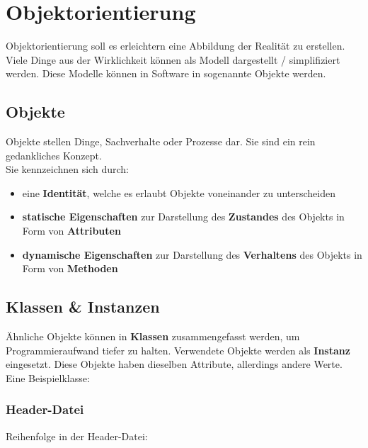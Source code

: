 \section{Objektorientierung}

Objektorientierung soll es erleichtern eine Abbildung der Realität zu erstellen. 
Viele Dinge aus der Wirklichkeit können als Modell dargestellt / simplifiziert werden. 
Diese Modelle können in Software in sogenannte Objekte  werden.

\subsection{Objekte}

Objekte stellen Dinge, Sachverhalte oder Prozesse dar. Sie sind ein rein gedankliches Konzept.\\
Sie kennzeichnen sich durch:

\begin{itemize}[itemsep=1pt, parsep=0pt]
    \item eine \textbf{Identität}, welche es erlaubt Objekte voneinander zu unterscheiden
    \item \textbf{statische Eigenschaften} zur Darstellung des \textbf{Zustandes} des Objekts in Form von \textbf{Attributen}
    \item \textbf{dynamische Eigenschaften} zur Darstellung des \textbf{Verhaltens} des Objekts in Form von \textbf{Methoden}
\end{itemize}


\subsection{Klassen \& Instanzen}

Ähnliche Objekte können in \textbf{Klassen} zusammengefasst werden, um Programmieraufwand tiefer zu halten. 
Verwendete Objekte werden als \textbf{Instanz} eingesetzt. Diese Objekte haben dieselben Attribute, allerdings andere Werte.\\
Eine Beispielklasse:\\



\nextcol

\subsubsection{Header-Datei}

Reihenfolge in der Header-Datei:


